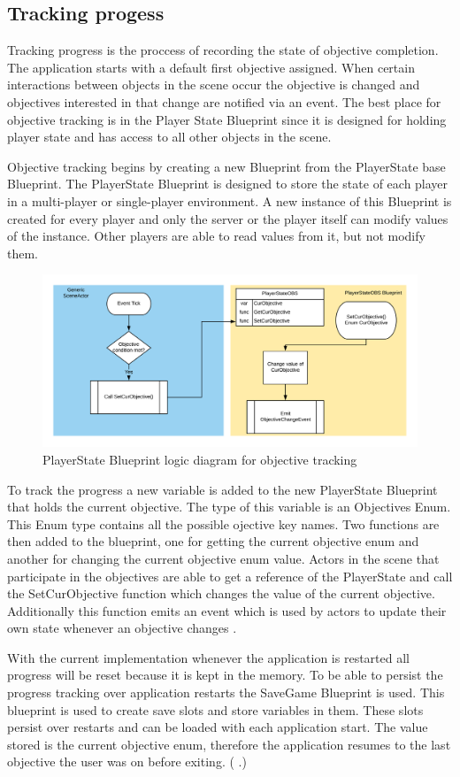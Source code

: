 \documentclass[12pt, a4paper,oneside, nocenter]{thesis}
\newcommand{\citeyeartitlexamk}[1]{(\usebibentry{#1}{title} \citeyear{#1}.)}
\begin{document}
\subsection{Tracking progess}
Tracking progress is the proccess of recording the state of objective completion. The application starts with a default first objective assigned. When certain interactions between objects in the scene occur the objective is changed and objectives interested in that change are notified via an event. The best place for objective tracking is in the Player State Blueprint since it is designed for holding player state and has access to all other objects in the scene.
\par
Objective tracking begins by creating a new Blueprint from the PlayerState base Blueprint. The PlayerState Blueprint is designed to store the state of each player in a multi-player or single-player environment. A new instance of this Blueprint is created for every player and only the server or the player itself can modify values of the instance. Other players are able to read values from it, but not modify them.
\begin{figure}[H]
	\includegraphics[width=\textwidth]{player-state}
	\caption{PlayerState Blueprint logic diagram for objective tracking}
	\label{fig:player-state}
\end{figure}
\par
To track the progress a new variable is added to the new PlayerState Blueprint that holds the current objective. The type of this variable is an Objectives Enum. This Enum type contains all the possible ojective key names. Two functions are then added to the blueprint, one for getting the current objective enum and another for changing the current objective enum value. Actors in the scene that participate in the objectives are able to get a reference of the PlayerState and call the SetCurObjective function which changes the value of the current objective. Additionally this function emits an event which is used by actors to update their own state whenever an objective changes .
\par
With the current implementation whenever the application is restarted all progress will be reset because it is kept in the memory. To be able to persist the progress tracking over application restarts the SaveGame Blueprint is used. This blueprint is used to create save slots and store variables in them. These slots persist over restarts and can be loaded with each application start. The value stored is the current objective enum, therefore the application resumes to the last objective the user was on before exiting. \citeyeartitlexamk{save-game}
\end{document}
